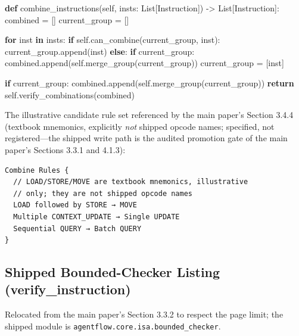 \documentclass[
  11pt,
]{article}
\newenvironment{Shaded}{}{}
\newcommand{\ControlFlowTok}[1]{\textcolor[rgb]{0.00,0.44,0.13}{\textbf{#1}}}
\newcommand{\KeywordTok}[1]{\textcolor[rgb]{0.00,0.44,0.13}{\textbf{#1}}}
\newcommand{\NormalTok}[1]{#1}
\newcommand{\OperatorTok}[1]{\textcolor[rgb]{0.40,0.40,0.40}{#1}}
\newcommand{\VariableTok}[1]{\textcolor[rgb]{0.10,0.09,0.49}{#1}}
\begin{document}
\begin{Shaded}
\begin{Highlighting}[]
\KeywordTok{def}\NormalTok{ combine\_instructions(}\VariableTok{self}\NormalTok{, insts: List[Instruction]) }\OperatorTok{{-}\textgreater{}}\NormalTok{ List[Instruction]:}
\NormalTok{    combined }\OperatorTok{=}\NormalTok{ []}
\NormalTok{    current\_group }\OperatorTok{=}\NormalTok{ []}
    
    \ControlFlowTok{for}\NormalTok{ inst }\KeywordTok{in}\NormalTok{ insts:}
        \ControlFlowTok{if} \VariableTok{self}\NormalTok{.can\_combine(current\_group, inst):}
\NormalTok{            current\_group.append(inst)}
        \ControlFlowTok{else}\NormalTok{:}
            \ControlFlowTok{if}\NormalTok{ current\_group:}
\NormalTok{                combined.append(}\VariableTok{self}\NormalTok{.merge\_group(current\_group))}
\NormalTok{            current\_group }\OperatorTok{=}\NormalTok{ [inst]}
            
    \ControlFlowTok{if}\NormalTok{ current\_group:}
\NormalTok{        combined.append(}\VariableTok{self}\NormalTok{.merge\_group(current\_group))}
    \ControlFlowTok{return} \VariableTok{self}\NormalTok{.verify\_combinations(combined)}
\end{Highlighting}
\end{Shaded}

The illustrative candidate rule set referenced by the main paper's
Section 3.4.4 (textbook mnemonics, explicitly \emph{not} shipped opcode
names; specified, not registered---the shipped write path is the audited
promotion gate of the main paper's Sections 3.3.1 and 4.1.3):

\begin{verbatim}
Combine Rules {
  // LOAD/STORE/MOVE are textbook mnemonics, illustrative
  // only; they are not shipped opcode names
  LOAD followed by STORE → MOVE
  Multiple CONTEXT_UPDATE → Single UPDATE
  Sequential QUERY → Batch QUERY
}
\end{verbatim}

\subsection{Shipped Bounded-Checker Listing
(verify\_instruction)}\label{shipped-bounded-checker-listing-verify_instruction}

Relocated from the main paper's Section 3.3.2 to respect the page limit;
the shipped module is \texttt{agentflow.core.isa.bounded\_checker}.
\end{document}
